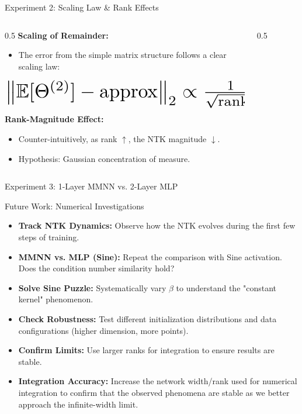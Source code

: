 \documentclass{beamer}
\begin{document}
\begin{frame}{Experiment 2: Scaling Law \& Rank Effects}
\begin{columns}[T]
    \begin{column}{0.5\textwidth}
        \textbf{Scaling of Remainder:}
        \begin{itemize}
            \item The error from the simple matrix structure follows a clear scaling law:
        \end{itemize}
        \begin{equation*}
        \resizebox{0.9\hsize}{!}{$
        \left\| \mathbb{E}[\Theta^{(2)}] - \text{approx} \right\|_2 \propto \frac{1}{\sqrt{\text{rank}_1}}
        $}
        \end{equation*}
        \textbf{Rank-Magnitude Effect:}
        \begin{itemize}
            \item Counter-intuitively, as rank $\uparrow$, the NTK magnitude $\downarrow$.
            \item Hypothesis: Gaussian concentration of measure.
        \end{itemize}
    \end{column}
    \begin{column}{0.5\textwidth}
        \begin{figure}
        \end{figure}
    \end{column}
\end{columns}
\end{frame}

\begin{frame}{Experiment 3: 1-Layer MMNN vs. 2-Layer MLP}

\end{frame}

\begin{frame}{Future Work: Numerical Investigations}
\begin{itemize}
    \item \textbf{Track NTK Dynamics:} Observe how the NTK evolves during the first few steps of training.
    \item \textbf{MMNN vs. MLP (Sine):} Repeat the comparison with Sine activation. Does the condition number similarity hold?
    \item \textbf{Solve Sine Puzzle:} Systematically vary $\beta$ to understand the "constant kernel" phenomenon.
    \item \textbf{Check Robustness:} Test different initialization distributions and data configurations (higher dimension, more points).
    \item \textbf{Confirm Limits:} Use larger ranks for integration to ensure results are stable.
    \item \textbf{Integration Accuracy:} Increase the network width/rank used for numerical integration to confirm that the observed phenomena are stable as we better approach the infinite-width limit.
\end{itemize}
\end{frame}
\end{document}
